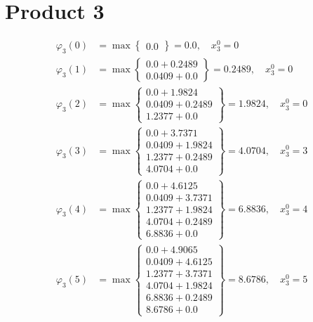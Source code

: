 \documentclass{article}
\begin{document}
\section{Product 3}
\begin{align*}
\varphi_{3}(0) &= \max \left\{ \begin{array}{c}
0.0
\end{array} \right\}=0.0, \quad x_{3}^0=0\\
  
\varphi_{3}(1) &= \max \left\{ \begin{array}{c}
0.0 + 0.2489 \\
 0.0409 + 0.0
\end{array} \right\}=0.2489, \quad x_{3}^0=0\\
  
\varphi_{3}(2) &= \max \left\{ \begin{array}{c}
0.0 + 1.9824 \\
 0.0409 + 0.2489 \\
 1.2377 + 0.0
\end{array} \right\}=1.9824, \quad x_{3}^0=0\\
  
\varphi_{3}(3) &= \max \left\{ \begin{array}{c}
0.0 + 3.7371 \\
 0.0409 + 1.9824 \\
 1.2377 + 0.2489 \\
 4.0704 + 0.0
\end{array} \right\}=4.0704, \quad x_{3}^0=3\\
  
\varphi_{3}(4) &= \max \left\{ \begin{array}{c}
0.0 + 4.6125 \\
 0.0409 + 3.7371 \\
 1.2377 + 1.9824 \\
 4.0704 + 0.2489 \\
 6.8836 + 0.0
\end{array} \right\}=6.8836, \quad x_{3}^0=4\\
  
\varphi_{3}(5) &= \max \left\{ \begin{array}{c}
0.0 + 4.9065 \\
 0.0409 + 4.6125 \\
 1.2377 + 3.7371 \\
 4.0704 + 1.9824 \\
 6.8836 + 0.2489 \\
 8.6786 + 0.0
\end{array} \right\}=8.6786, \quad x_{3}^0=5\\
  

\end{align*}
\end{document}
